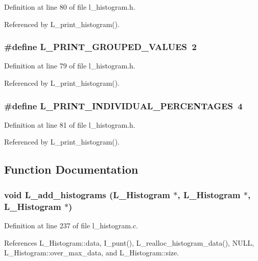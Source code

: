 Definition at line 80 of file l\_\-histogram.h.

Referenced by L\_\-print\_\-histogram().
\subsubsection{\setlength{\rightskip}{0pt plus 5cm}\#define L\_\-PRINT\_\-GROUPED\_\-VALUES~2}\label{l__histogram_8h_0f034c949f5133dee317770dae84e902}




Definition at line 79 of file l\_\-histogram.h.

Referenced by L\_\-print\_\-histogram().
\subsubsection{\setlength{\rightskip}{0pt plus 5cm}\#define L\_\-PRINT\_\-INDIVIDUAL\_\-PERCENTAGES~4}\label{l__histogram_8h_56418bdbe7b6660c4d4306d69f0f5c08}




Definition at line 81 of file l\_\-histogram.h.

Referenced by L\_\-print\_\-histogram().

\subsection{Function Documentation}
\subsubsection{\setlength{\rightskip}{0pt plus 5cm}void L\_\-add\_\-histograms (\bf{L\_\-Histogram} $\ast$, \bf{L\_\-Histogram} $\ast$, \bf{L\_\-Histogram} $\ast$)}\label{l__histogram_8h_9fbcd43733b6da39f59c01f508f131ce}




Definition at line 237 of file l\_\-histogram.c.

References L\_\-Histogram::data, I\_\-punt(), L\_\-realloc\_\-histogram\_\-data(), NULL, L\_\-Histogram::over\_\-max\_\-data, and L\_\-Histogram::size.
